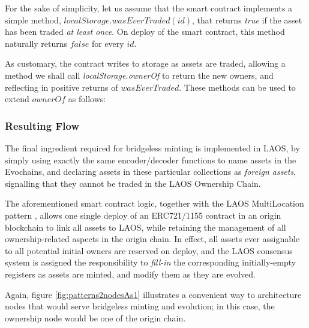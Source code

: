 For the sake of simplicity, let us assume that the smart contract implements 
a simple method, $localStorage.wasEverTraded(id)$, that returns {\it true} if the asset 
has been traded {\it at least once}. On deploy of the smart contract,
this method naturally returns $false$ for every $id$.

As customary, the contract writes to storage as assets are traded,
allowing a method we shall call {\it localStorage.ownerOf} to return
the new owners, and reflecting in positive returns of $wasEverTraded$.
These methods can be used to extend $ownerOf$ as follows:

\begin{algorithm}[H]
    
\end{algorithm}

\subsubsection{Resulting Flow}

The final ingredient required for bridgeless minting is implemented in LAOS,
by simply using exactly the same encoder/decoder functions  to name assets
in the Evochains, and declaring assets in these particular collections as {\it foreign 
assets}, signalling that they cannot be traded in the LAOS Ownership Chain.

The aforementioned smart contract logic, together with the LAOS MultiLocation
pattern , allows one single deploy of an ERC721/1155
contract in an origin blockchain to link all assets to LAOS, while retaining 
the management of all ownership-related aspects in the origin chain. 
In effect, all assets ever assignable to all potential initial owners are reserved on deploy,
and the LAOS consensus system is assigned the responsibility to {\it fill-in} the
corresponding initially-empty registers as assets are minted, and modify them
as they are evolved.

Again, figure \ref{fig:patterns2nodesAs1} illustrates a convenient way to architecture
nodes that would serve bridgeless minting and evolution; in this case, the ownership
node would be one of the origin chain.
 
